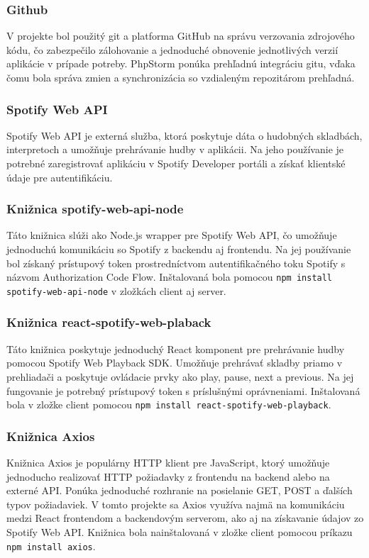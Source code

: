 \subsubsection{Github}
V projekte bol použitý git a platforma GitHub na správu verzovania zdrojového kódu, čo zabezpečilo zálohovanie a jednoduché obnovenie jednotlivých verzií aplikácie v prípade potreby. PhpStorm ponúka prehľadnú integráciu gitu, vďaka čomu bola správa zmien a synchronizácia so vzdialeným repozitárom prehľadná.

\subsubsection{Spotify Web API}
Spotify Web API je externá služba, ktorá poskytuje dáta o hudobných skladbách, interpretoch a umožňuje prehrávanie hudby v aplikácii. Na jeho používanie je potrebné zaregistrovať aplikáciu v Spotify Developer portáli a získať klientské údaje pre autentifikáciu.

\subsubsection{Knižnica spotify-web-api-node}
Táto knižnica slúži ako Node.js wrapper pre Spotify Web API, čo umožňuje jednoduchú komunikáciu so Spotify z backendu aj frontendu. Na jej používanie bol získaný prístupový token prostredníctvom autentifikačného toku Spotify s názvom Authorization Code Flow. Inštalovaná bola pomocou \texttt{npm install spotify-web-api-node} v zložkách client aj server.

\subsubsection{Knižnica react-spotify-web-plaback}
Táto knižnica poskytuje jednoduchý React komponent pre prehrávanie hudby pomocou Spotify Web Playback SDK. Umožňuje prehrávať skladby priamo v prehliadači a poskytuje ovládacie prvky ako play, pause, next a previous. Na jej fungovanie je potrebný prístupový token s príslušnými oprávneniami.
Inštalovaná bola v zložke client pomocou \texttt{npm install react-spotify-web-playback}.

\subsubsection{Knižnica Axios}
Knižnica Axios je populárny HTTP klient pre JavaScript, ktorý umožňuje jednoducho realizovať HTTP požiadavky z frontendu na backend alebo na externé API. Ponúka jednoduché rozhranie na posielanie GET, POST a ďalších typov požiadaviek. V tomto projekte sa Axios využíva najmä na komunikáciu medzi React frontendom a backendovým serverom, ako aj na získavanie údajov zo Spotify Web API. Knižnica bola nainštalovaná v zložke client pomocou príkazu \texttt{npm install axios}.

